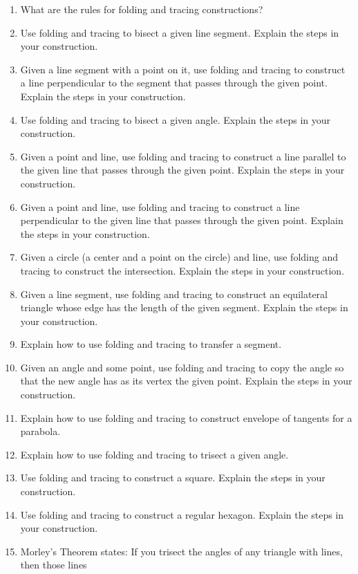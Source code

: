 \begin{problems}
\begin{enumerate}
\item What are the rules for folding and tracing constructions?
\item Use folding and tracing to bisect a given line segment. Explain the steps in
  your construction.
\item Given a line segment with a point on it, use folding and tracing to
  construct a line perpendicular to the segment that passes through
  the given point. Explain the steps in your construction.
\item Use folding and tracing to bisect a given angle. Explain the steps in your
  construction.
\item Given a point and line, use folding and tracing to construct a line parallel
  to the given line that passes through the given point. Explain the
  steps in your construction.
\item Given a point and line, use folding and tracing to construct a line
  perpendicular to the given line that passes through the given
  point. Explain the steps in your construction.
\item Given a circle (a center and a point on the circle) and line,
  use folding and tracing to construct the intersection. Explain the steps in your
  construction.
\item Given a line segment, use folding and tracing to construct an equilateral
  triangle whose edge has the length of the given segment. Explain the
  steps in your construction.
\item Explain how to use folding and tracing to transfer a segment.
\item Given an angle and some point, use folding and tracing to copy the angle so
  that the new angle has as its vertex the given point. Explain the
  steps in your construction.
\item Explain how to use folding and tracing to construct envelope of tangents for
  a parabola.
\item Explain how to use folding and tracing to trisect a given angle.
\item Use folding and tracing to construct a square. Explain the steps in your construction.
\item Use folding and tracing to construct a regular hexagon. Explain the steps in
  your construction.
\item Morley's Theorem states:
If you trisect the angles of any triangle with lines, then those lines

\end{enumerate}
\end{problems}

